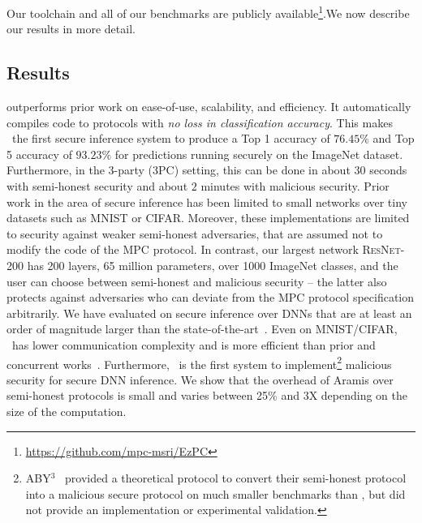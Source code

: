 Our toolchain and all of our benchmarks are publicly
available\footnote{\url{https://github.com/mpc-msri/EzPC}}.We now describe our results in more detail.

\subsection{Results}
\tool outperforms prior work on ease-of-use, scalability, and efficiency. It automatically compiles \tensorflow code to \mpc protocols with {\em no loss in classification accuracy}. This makes \cryptflow\ the first secure inference system to produce a Top 1 accuracy of $76.45\%$ and Top 5 accuracy of $93.23\%$ for predictions running securely on the ImageNet dataset. Furthermore, in the 3-party (3PC) setting, this can be done in about $30$ seconds with semi-honest security and about $2$ minutes with malicious security. 
Prior work in the area of secure inference has been limited to small networks over tiny datasets such as MNIST or CIFAR.
  Moreover, these implementations are limited to security against weaker semi-honest adversaries, that are assumed not to modify the code of the MPC protocol.
In contrast, our largest network \textsc{ResNet-200} has 200 layers, 65 million parameters, over 1000 ImageNet classes, and the user can choose between semi-honest and malicious security -- the latter also protects against adversaries who can deviate from the MPC protocol specification arbitrarily. 
We have evaluated \tool on secure inference over DNNs that are at least an order of magnitude larger
than the state-of-the-art~\cite{delphi,chet,chameleon,securenn,secureml,gazelle,ezpc,minionn,aby3,nhe,xonn,quantizednn}.
Even on MNIST/CIFAR, \cryptflow\ has lower communication complexity and is more efficient than prior and concurrent works~\cite{securenn,aby3,chameleon,quantizednn}. 
Furthermore, \cryptflow\ is the first system to implement\footnote{ABY$^3$~\cite{aby3} provided a theoretical protocol to convert their semi-honest protocol into a malicious secure protocol on much smaller benchmarks than \cryptflow, but did not provide an implementation or experimental validation.} malicious security for secure DNN inference. 
We show that the overhead of Aramis over semi-honest protocols is small and varies between 25\% and 3X depending on the size of the computation.
